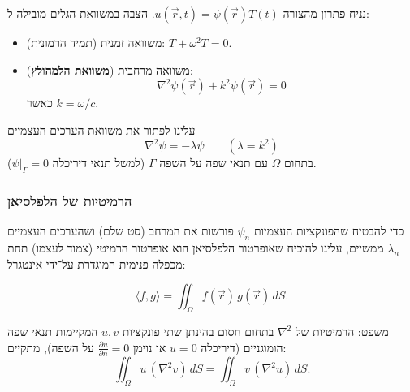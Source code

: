 נניח פתרון מהצורה $u(\vec{r},t) = \psi(\vec{r})T(t)$. הצבה במשוואת הגלים מובילה ל:
\begin{itemize}
    \item משוואה זמנית (תמיד הרמונית): $\ddot{T} + \omega^2 T = 0$.
    \item משוואה מרחבית (\textbf{משוואת הלמהולץ}):
    \begin{equation}
    \nabla^2 \psi(\vec{r}) + k^2 \psi(\vec{r}) = 0
    \end{equation}
    כאשר $k = \omega/c$.
\end{itemize}
עלינו לפתור את משוואת הערכים העצמיים
\[
\nabla^2 \psi = -\lambda \psi \qquad (\lambda = k^2)
\]
בתחום $\Omega$ עם תנאי שפה על השפה $\Gamma$
(למשל תנאי דיריכלה $\psi|_{\Gamma} = 0$).

\subsubsection{הרמיטיות של הלפלסיאן}

כדי להבטיח שהפונקציות העצמיות $\psi_n$ פורשות את המרחב (סט שלם)
ושהערכים העצמיים $\lambda_n$ ממשיים, עלינו להוכיח שאופרטור הלפלסיאן
הוא אופרטור הרמיטי (צמוד לעצמו) תחת מכפלה פנימית המוגדרת על־ידי
אינטגרל:

\[
\langle f, g \rangle
=
\iint_{\Omega} f(\vec{r})\, g(\vec{r}) \, dS .
\]

\begin{theorembox}{משפט: הרמיטיות של $\nabla^2$ בתחום חסום}
בהינתן שתי פונקציות $u, v$ המקיימות תנאי שפה הומוגניים
(דיריכלה $u=0$ או נוימן $\frac{\partial u}{\partial n}=0$ על השפה),
מתקיים:
\begin{equation}
\iint_{\Omega} u \, (\nabla^2 v) \, dS
=
\iint_{\Omega} v \, (\nabla^2 u) \, dS .
\end{equation}
\end{theorembox}


